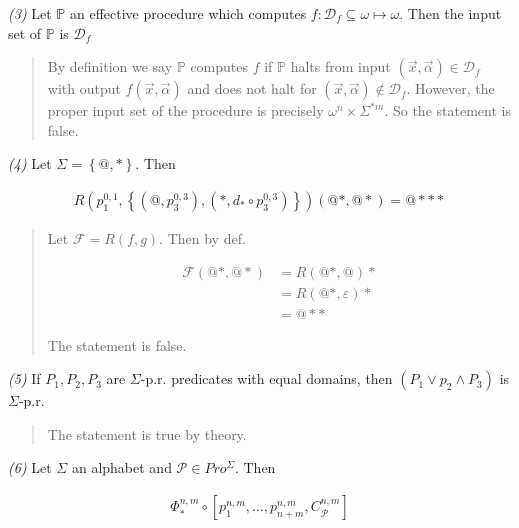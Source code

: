 \documentclass[a4paper, 12pt]{article}
\begin{document}
\textit{(3)} Let $\mathbb{P}$ an effective procedure which computes $f :
\mathcal{D}_f \subseteq \omega \mapsto \omega$. Then the input set of
$\mathbb{P}$ is $\mathcal{D}_f$


\small
\begin{quote}

By definition we say $\mathbb{P}$ computes $f$ if $\mathbb{P}$ halts from input
$(\vec{x}, \vec{\alpha}) \in \mathcal{D}_f$ with output $f(\vec{x},
\vec{\alpha}) $ and does not halt for $(\vec{x}, \vec{\alpha}) \not\in
\mathcal{D}_f$. However, the proper input set of the procedure is precisely
$\omega^{n} \times \Sigma^{*m} $. So the statement is false.

\end{quote}
\normalsize


\textit{(4)} Let $\Sigma = \left\{ @, * \right\} $. Then 

\begin{align*}
    R(p_1^{0, 1}, \left\{ (@, p_3^{0, 3}), (*, d_* \circ p_3^{0, 3}) \right\}
    )(@*, @*) = @***
\end{align*}


\small
\begin{quote}

    Let $\mathcal{F} = R(f, g)$. Then by def.

\begin{align*}
    \mathcal{F}(@*, @*) &= R(@*, @)* \\ 
    &=R(@*, \varepsilon )* \\ 
    &= @**
\end{align*}

The statement is false.
\end{quote}
\normalsize




\textit{(5)} If $P_1, P_2, P_3$ are $\Sigma$-p.r. predicates with equal domains,
then $(P_1 \lor p_2 \land P_3)$ is $\Sigma$-p.r. 


\small
\begin{quote}

The statement is true by theory. 

\end{quote}
\normalsize


\textit{(6)} Let $\Sigma$ an alphabet and $\mathcal{P} \in Pro^{\Sigma}$. Then 

\begin{align*}
    \Phi_{*}^{n, m} \circ \left[ p_1^{n, m}, \ldots, p^{n,
    m}_{n+m}, C_{\mathcal{P}}^{n, m} \right] 
\end{align*}
\end{document}
